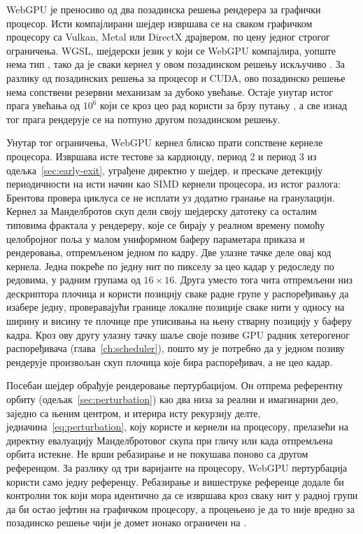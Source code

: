 \documentclass[serbian]{ftndiplomski}
\begin{document}
WebGPU је преносиво од два позадинска решења рендерера за графички процесор. Исти
компајлирани шејдер извршава се на сваком графичком процесору са Vulkan, Metal или
DirectX драјвером, по цену једног строгог ограничења. WGSL, шејдерски језик у који се
WebGPU компајлира, уопште нема тип , тако да је сваки кернел у овом
позадинском решењу искључиво . За разлику од позадинских решења за процесор и
CUDA, ово позадинско решење нема сопствени резервни механизам за дубоко увећање.
Остаје унутар истог прага увећања од $10^6$ који се кроз цео рад користи за брзу
путању , а све изнад тог прага рендерује се на потпуно другом позадинском
решењу.

Унутар тог ограничења, WebGPU кернел блиско прати сопствене  кернеле
процесора. Извршава исте тестове за кардиоиду, период 2 и период 3 из
одељка~\ref{sec:early-exit}, уграђене директно у шејдер, и прескаче детекцију
периодичности на исти начин као SIMD кернели процесора, из истог разлога: Брентова
провера циклуса се не исплати уз додатно гранање на  гранулацији. Кернел за
Манделбротов скуп дели своју шејдерску датотеку са осталим типовима фрактала у
рендереру, које се бирају у реалном времену помоћу целобројног поља у малом
униформном баферу параметара приказа и рендеровања, отпремљеном једном по кадру. Две
улазне тачке деле овај код кернела. Једна покреће по једну нит по пикселу за цео кадар
у редоследу по редовима, у радним групама од $16 \times 16$. Друга уместо тога чита
отпремљени низ дескриптора плочица и користи позицију сваке радне групе у
распоређивању да изабере једну, проверавајући границе локалне позиције сваке нити у
односу на ширину и висину те плочице пре уписивања на њену стварну позицију у баферу
кадра. Кроз ову другу улазну тачку шаље своје позиве GPU радник хетерогеног
распоређивача (глава~\ref{ch:scheduler}), пошто му је потребно да у једном позиву
рендерује произвољан скуп плочица које бира распоређивач, а не цео кадар.

Посебан шејдер обрађује рендеровање пертурбацијом. Он отпрема референтну орбиту
(одељак~\ref{sec:perturbation}) као два  низа за реални и имагинарни део,
заједно са њеним центром, и итерира исту рекурзију делте, једначина~\ref{eq:perturbation},
коју користе и кернели на процесору, прелазећи на директну  евалуацију
Манделбротовог скупа при гличу или када отпремљена орбита истекне. Не врши ребазирање и
не покушава поново са другом референцом. За разлику од три варијанте на процесору,
WebGPU пертурбација користи само једну референцу. Ребазирање и вишеструке референце
додале би контролни ток који мора идентично да се извршава кроз сваку нит у радној
групи да би остао јефтин на графичком процесору, а процењено је да то није вредно за
позадинско решење чији је домет ионако ограничен на .
\end{document}
